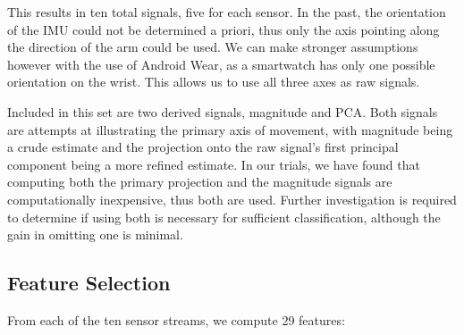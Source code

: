 This results in ten total signals, five for each sensor. In the past, the orientation of the IMU could not be determined a priori, thus only the axis pointing along the direction of the arm could be used. We can make stronger assumptions however with the use of Android Wear, as a smartwatch has only one possible orientation on the wrist. This allows us to use all three axes as raw signals.

Included in this set are two derived signals, magnitude and PCA. Both signals are attempts at illustrating the primary axis of movement, with magnitude being a crude estimate and the projection onto the raw signal's first principal component being a more refined estimate. In our trials, we have found that computing both the primary projection and the magnitude signals are computationally inexpensive, thus both are used. Further investigation is required to determine if using both is necessary for sufficient classification, although the gain in omitting one is minimal.

\subsection{Feature Selection} 
From each of the ten sensor streams, we compute 29 features: 


